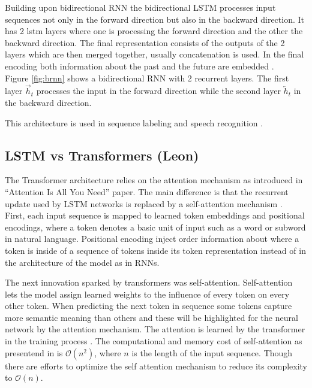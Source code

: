 \documentclass[twoside,a4paper,10pt,DIV=12,BCOR=12mm]{scrartcl}
\begin{document}
Building upon bidirectional RNN \cite{Schuster97} the bidirectional LSTM processes input sequences not only in the 
forward direction but also in the backward direction. It has 2 lstm layers where one is processing the forward direction
and the other the backward direction. The final representation consists of the outputs of the 2 layers which are then merged together,
usually concatenation is used. In the final encoding both information about the past and the future are embedded \cite{Graves05}.\\
Figure \ref{fig:brnn} shows a bidirectional RNN with 2 recurrent layers. The first layer $\overrightarrow{h}_t$ processes
the input in the forward direction while the second layer $\overleftarrow{h}_t$ in the backward direction.



This architecture is used in sequence labeling \cite{huang2015bidirectionallstmcrfmodelssequence} and speech recognition \cite{graves2013speechrecognitiondeeprecurrent}.

\subsection{LSTM vs Transformers (Leon)}

The Transformer architecture relies on the attention mechanism as introduced in “Attention Is All You Need” paper.
The main difference is that the recurrent update used by LSTM networks is replaced by a self-attention mechanism \cite{vaswani2017attention}.\\


First, each input sequence is mapped to learned token embeddings and positional encodings,
where a token denotes a basic unit of input such as a word or subword in natural language.
Positional encoding inject order information about where a token is inside of a sequence of tokens inside
its token representation instead of in the architecture of the model as in RNNs.


The next innovation sparked by transformers was self-attention. Self-attention lets the model assign learned weights to the influence of every token on every other token.
When predicting the next token in sequence some tokens capture more semantic meaning than others and these will be highlighted for the neural network by the 
attention mechanism. The attention is learned by the transformer in the training process \cite{vaswani2017attention}.
The computational and memory cost of self-attention as presentend in \cite{vaswani2017attention} is $\mathcal{O}(n^2)$,
where $n$ is the length of the input sequence.
Though there are efforts to optimize the self attention mechanism to reduce its complexity to $\mathcal{O}(n)$. \cite{katharopoulos2020transformersrnnsfastautoregressive}
\end{document}
